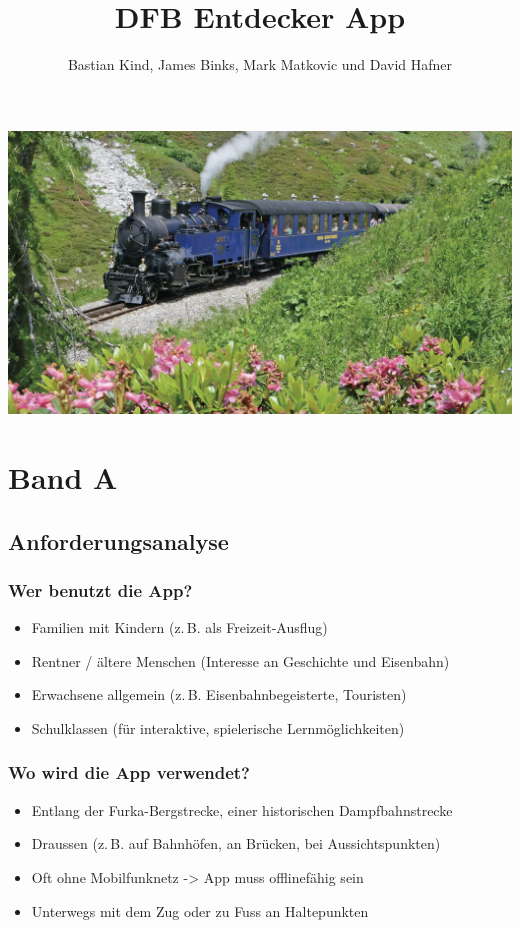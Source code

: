 \documentclass[10pt]{article}
\title{DFB Entdecker App}
\author{Bastian Kind, James Binks, Mark Matkovic und David Hafner}
\begin{document}
	\maketitle
	\includegraphics[width=17.5cm]{title}
	\pagebreak
	\tableofcontents
	\pagebreak
	\section{Band A}
	\subsection{Anforderungsanalyse}
	\subsubsection[Wer]{Wer benutzt die App?}
	\begin{itemize}
		\item Familien mit Kindern (z. B. als Freizeit-Ausflug)
		\item Rentner / ältere Menschen (Interesse an Geschichte und Eisenbahn)
		\item Erwachsene allgemein (z. B. Eisenbahnbegeisterte, Touristen)
		\item Schulklassen (für interaktive, spielerische Lernmöglichkeiten)
	\end{itemize}
	\subsubsection[Wo]{Wo wird die App verwendet?}
	\begin{itemize}
		\item Entlang der Furka-Bergstrecke, einer historischen Dampfbahnstrecke
		\item Draussen (z. B. auf Bahnhöfen, an Brücken, bei Aussichtspunkten)
		\item Oft ohne Mobilfunknetz -> App muss offlinefähig sein
		\item Unterwegs mit dem Zug oder zu Fuss an Haltepunkten
	\end{itemize}
\end{document}
